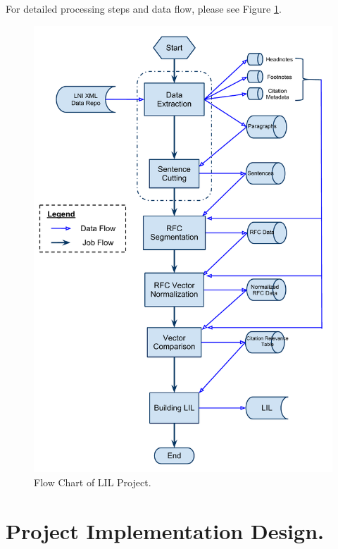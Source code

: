 \documentclass[12pt]{article}
\begin{document}
For detailed processing steps and data flow, please see Figure
\ref{fig:proj_flow}. 

\begin{figure}[H]
\centering
\includegraphics[height=0.95\textheight]{LILFlowChart.pdf}
\caption{Flow Chart of LIL Project.}
\label{fig:proj_flow}
\end{figure}

\section{Project Implementation Design.}
\end{document}
